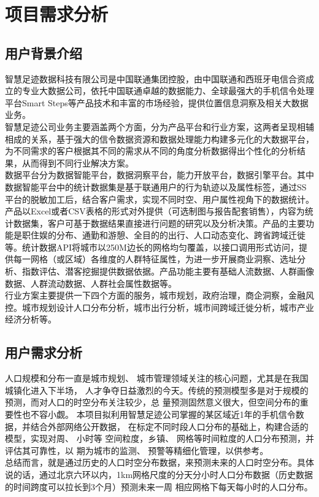 
\chapter{项目需求分析} %

\label{Chapter2} 
\section{用户背景介绍}
智慧足迹数据科技有限公司是中国联通集团控股，由中国联通和西班牙电信合资成立的专业大数据公司，依托中国联通卓越的数据能力、全球最强大的手机信令处理平台Smart Steps等产品技术和丰富的市场经验，提供位置信息洞察及相关大数据业务。\\
\indent 智慧足迹公司业务主要涵盖两个方面，分为产品平台和行业方案，这两者呈现相辅相成的关系，基于强大的信令数据资源和数据处理能力构建多元化的大数据平台，为不同需求的客户根据其不同的需求从不同的角度分析数据得出个性化的分析结果，从而得到不同行业解决方案。\\
\indent 数据平台分为数据智能平台，数据洞察平台，能力开放平台，数据引擎平台。其中数据智能平台中的统计数据集是基于联通用户的行为轨迹以及属性标签，通过SS平台的脱敏加工后，结合客户需求，实现不同时空、用户属性视角下的数据统计。产品以Excel或者CSV表格的形式对外提供（可选制图与报告配套销售），内容为统计数据集，客户可基于数据结果直接进行问题的研究以及分析决策。产品的主要功能是职住娱的分布、通勤和游憩、全目的的出行、人口动态变化、跨省跨域迁徙等。统计数据API将城市以250M边长的网格均匀覆盖，以接口调用形式访问，提供每一网格（或区域）各维度的人群特征属性，为进一步开展商业洞察、选址分析、指数评估、潜客挖掘提供数据依据。产品功能主要有基础人流数据、人群画像数据、人群流动数据、人群社会属性数据等。\\
\indent 行业方案主要提供一下四个方面的服务，城市规划，政府治理，商企洞察，金融风控。城市规划设计人口分布分析，城市出行分析，城市间跨域迁徙分析，城市产业经济分析等。
\section{用户需求分析}
人口规模和分布一直是城市规划、 城市管理领域关注的核心问题，尤其是在我国城镇化进入下半场， 人才争夺日益激烈的今天。传统的预测模型多是对于规模的预测，而对人口的时空分布关注较少，总
量预测固然意义很大，但空间分布的重要性也不容小觑。 本项目拟利用智慧足迹公司掌握的某区域近1年的手机信令数据，并结合外部网络公开数据，
在标定不同时段人口分布的基础上，构建合适的模型，实现对周、 小时等
空间粒度，乡镇、 网格等时间粒度的人口分布预测，并评估其可靠性，以
期为城市的监测、 预警等精细化管理，以供参考。\\
\indent 总结而言，就是通过历史的人口时空分布数据，来预测未来的人口时空分布。具体说的话，通过北京六环以内，1km网格尺度的分天分小时人口分布数据（历史数据的时间跨度可以拉长到3个月）预测未来一周 相应网格下每天每小时的人口分布。
